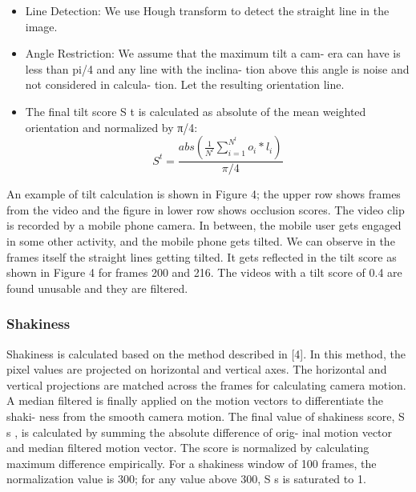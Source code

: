 \documentclass{sig-alternate}
\begin{document}
\begin{itemize}
  \item Line Detection: We use Hough transform to detect the straight
line in the image. 
  \item Angle Restriction: We assume that the maximum tilt a cam-
era can have is less than pi/4 and any line with the inclina-
tion above this angle is noise and not considered in calcula-
tion. Let the resulting orientation line.
  \item The final tilt score S t is calculated as absolute of the mean
weighted orientation and normalized by π/4:
     \begin{equation}
              S^t = \frac{abs(\frac{1}{N^l}\sum_{i=1}^{N^l}o_{i}*l_{i})}{\pi/4}
       \end{equation}
\end{itemize}

\par An example of tilt calculation is shown in Figure 4; the upper
row shows frames from the video and the figure in lower row shows
occlusion scores. The video clip is recorded by a mobile phone
camera. In between, the mobile user gets engaged in some other
activity, and the mobile phone gets tilted. We can observe in the
frames itself the straight lines getting tilted. It gets reflected in the
tilt score as shown in Figure 4 for frames 200 and 216. The videos
with a tilt score of 0.4 are found unusable and they are filtered.


\subsubsection{Shakiness}
Shakiness is calculated based on the method described in [4].
In this method, the pixel values are projected on horizontal and
vertical axes. The horizontal and vertical projections are matched
across the frames for calculating camera motion. A median filtered
is finally applied on the motion vectors to differentiate the shaki-
ness from the smooth camera motion. The final value of shakiness
score, S s , is calculated by summing the absolute difference of orig-
inal motion vector and median filtered motion vector. The score is
normalized by calculating maximum difference empirically. For a
shakiness window of 100 frames, the normalization value is 300;
for any value above 300, S s is saturated to 1.
\end{document}
